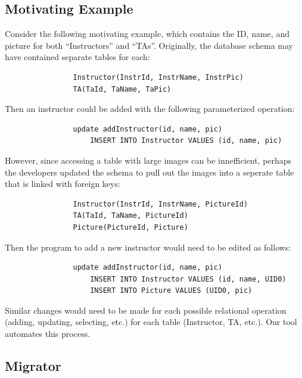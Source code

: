 \documentclass[]{article}
\begin{document}
        \subsection{Motivating Example}

            Consider the following motivating example, which contains the ID, name, and picture for both ``Instructors'' and ``TAs''. Originally, the database schema may have contained separate tables for each:
             
            \begin{verbatim}
                Instructor(InstrId, InstrName, InstrPic)
                TA(TaId, TaName, TaPic)     
            \end{verbatim}
            
            Then an instructor could be added with the following parameterized operation:

            \begin{verbatim}
                update addInstructor(id, name, pic) 
                    INSERT INTO Instructor VALUES (id, name, pic)
            \end{verbatim}

            However, since accessing a table with large images can be innefficient, perhaps the developers updated the schema to pull out the images into a seperate table that is linked with foreign keys:
            
            \begin{verbatim}
                Instructor(InstrId, InstrName, PictureId)
                TA(TaId, TaName, PictureId) 
                Picture(PictureId, Picture) 
            \end{verbatim}

            Then the program to add a new instructor would need to be edited as follows:
            
            \begin{verbatim}
                update addInstructor(id, name, pic) 
                    INSERT INTO Instructor VALUES (id, name, UID0)
                    INSERT INTO Picture VALUES (UID0, pic)
            \end{verbatim}

            Similar changes would need to be made for each possible relational operation (adding, updating, selecting, etc.) for each table (Instructor, TA, etc.). Our tool automates this process. 


        \subsection{Migrator}
\end{document}
